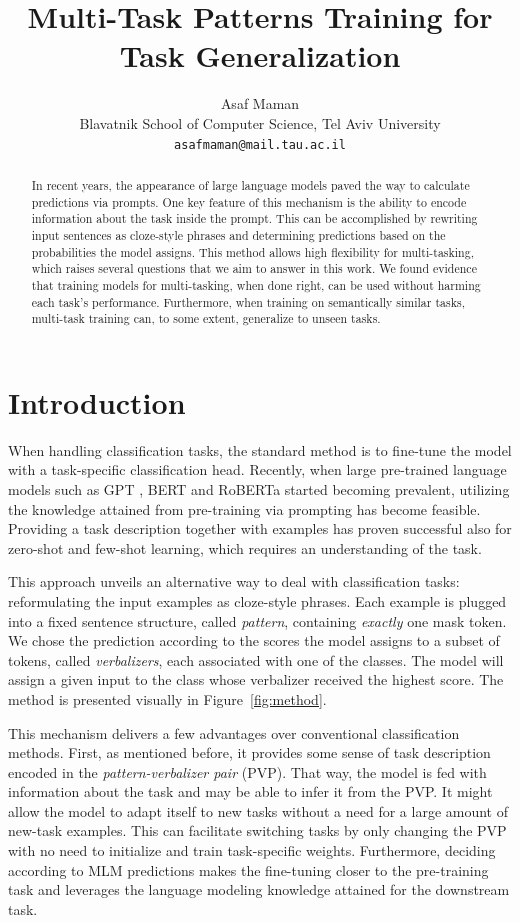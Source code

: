 \documentclass[11pt,a4paper]{article}
\title{Multi-Task Patterns Training for Task Generalization}
\author{Asaf Maman \\
  Blavatnik School of Computer Science, Tel Aviv University \\
  \texttt{asafmaman@mail.tau.ac.il} \\}
\date{}
\begin{document}
\maketitle

\begin{abstract}
In recent years, the appearance of large language models paved the way to calculate predictions via prompts.
One key feature of this mechanism is the ability to encode information about the task inside the prompt.
This can be accomplished by rewriting input sentences as cloze-style phrases and determining predictions based on the probabilities the model assigns.
This method allows high flexibility for multi-tasking, which raises several questions that we aim to answer in this work.
We found evidence that training models for multi-tasking, when done right, can be used without harming each task's performance.
Furthermore, when training on semantically similar tasks, multi-task training can, to some extent, generalize to unseen tasks.
\end{abstract}


\section{Introduction}
When handling classification tasks, the standard method is to fine-tune the model with a task-specific classification head.
Recently, when large pre-trained language models such as GPT \citep{radford2018improving}, BERT \citep{devlin2019bert} and RoBERTa \citep{liu2019roberta} started becoming prevalent, utilizing the knowledge attained from pre-training via prompting has become feasible.
Providing a task description together with examples has proven successful \citep{radford2019language} also for zero-shot and few-shot learning, which requires an understanding of the task.

This approach unveils an alternative way to deal with classification tasks: reformulating the input examples as cloze-style phrases.
Each example is plugged into a fixed sentence structure, called \textit{pattern}, containing \textit{exactly} one mask token.
We chose the prediction according to the scores the model assigns to a subset of tokens, called \textit{verbalizers}, each associated with one of the classes.
The model will assign a given input to the class whose verbalizer received the highest score.
The method is presented visually in Figure~\ref{fig:method}.

This mechanism delivers a few advantages over conventional classification methods.
First, as mentioned before, it provides some sense of task description encoded in the \textit{pattern-verbalizer pair} (PVP).
That way, the model is fed with information about the task and may be able to infer it from the PVP.
It might allow the model to adapt itself to new tasks without a need for a large amount of new-task examples.
This can facilitate switching tasks by only changing the PVP with no need to initialize and train task-specific weights.
Furthermore, deciding according to MLM predictions makes the fine-tuning closer to the pre-training task and leverages the language modeling knowledge attained for the downstream task.
\end{document}
